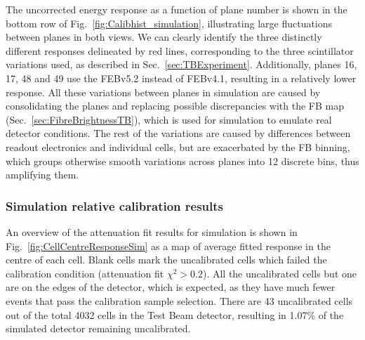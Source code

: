 The uncorrected energy response as a function of plane number is shown in the bottom row of Fig.~\ref{fig:Calibhist_simulation}, illustrating large fluctuations between planes in both views. We can clearly identify the three distinctly different responses delineated by red lines, corresponding to the three scintillator variations used, as described in Sec.~\ref{sec:TBExperiment}. Additionally, planes 16, 17, 48 and 49 use the \gls{FEB}v5.2 instead of \gls{FEB}v4.1, resulting in a relatively lower response. All these variations between planes in simulation are caused by consolidating the planes and replacing possible discrepancies with the \gls{FB} map (Sec.~\ref{sec:FibreBrightnessTB}), which is used for simulation to emulate real detector conditions. The rest of the variations are caused by differences between readout electronics and individual cells, but are exacerbated by the \gls{FB} binning, which groups otherwise smooth variations across planes into 12 discrete bins, thus amplifying them.

\subsubsection*{Simulation relative calibration results}

An overview of the attenuation fit results for simulation is shown in Fig.~\ref{fig:CellCentreResponseSim} as a map of average fitted response in the centre of each cell. Blank cells mark the uncalibrated cells which failed the calibration condition (attenuation fit $\chi^2>0.2$). All the uncalibrated cells but one are on the edges of the detector, which is expected, as they have much fewer events that pass the calibration sample selection. There are 43 uncalibrated cells out of the total 4032 cells in the Test Beam detector, resulting in 1.07\% of the simulated detector remaining uncalibrated.

